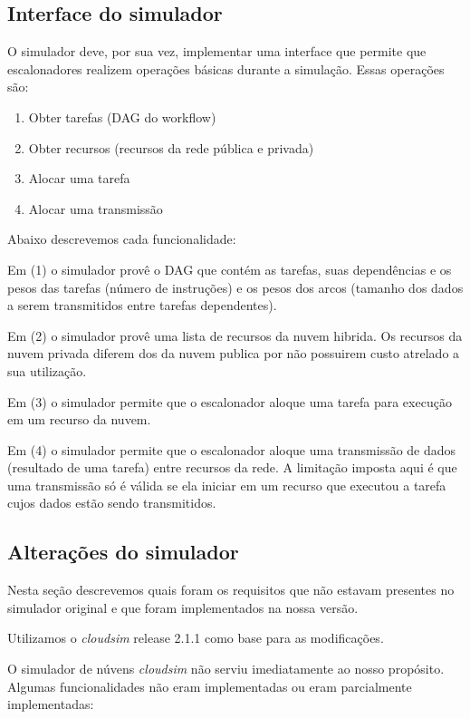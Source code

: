 \documentclass[a4paper,10pt, draft]{article}
\begin{document}
\subsection{Interface do simulador}

O simulador deve, por sua vez, implementar uma interface que permite que escalonadores
realizem operações básicas durante a simulação. Essas operações são:

\begin{enumerate}

  \item Obter tarefas (DAG do workflow)
  \item Obter recursos (recursos da rede pública e privada)
  \item Alocar uma tarefa
  \item Alocar uma transmissão

\end{enumerate}

Abaixo descrevemos cada funcionalidade:

Em (1) o simulador provê o DAG que contém as tarefas, suas dependências e os pesos das tarefas (número
de instruções) e os pesos dos arcos (tamanho dos dados a serem transmitidos entre tarefas dependentes).

Em (2) o simulador provê uma lista de recursos da nuvem hibrida. Os recursos da nuvem privada diferem
dos da nuvem publica por não possuirem custo atrelado a sua utilização.

Em (3) o simulador permite que o escalonador aloque uma tarefa para execução em um recurso da nuvem.

Em (4) o simulador permite que o escalonador aloque uma transmissão de dados (resultado de uma tarefa)
entre recursos da rede. A limitação imposta aqui é que uma transmissão só é válida se ela iniciar em um
recurso que executou a tarefa cujos dados estão sendo transmitidos.

\subsection{Alterações do simulador}

Nesta seção descrevemos quais foram os requisitos que não estavam presentes no simulador original
e que foram implementados na nossa versão.

Utilizamos o \emph{cloudsim} release 2.1.1 como base para as modificações.
 
O simulador de núvens \emph{cloudsim} não serviu imediatamente ao nosso propósito. Algumas funcionalidades
não eram implementadas ou eram parcialmente implementadas:
\end{document}
